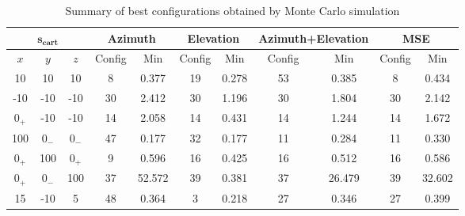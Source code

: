 \begin{table}[!htbp] %
	\begin{center}
		\begin{tabular}{ c c c |c c | c c | c c | c c }
			\toprule
			\multicolumn{3}{c|}{\textbf{$\bm{s_{cart}}$}} & \multicolumn{2}{c|}{\textbf{Azimuth}} & \multicolumn{2}{c|}{\textbf{Elevation}} & \multicolumn{2}{c|}{\textbf{Azimuth+Elevation}} & \multicolumn{2}{c}{\textbf{MSE}}   \\
			\midrule
			\multicolumn{1}{c}{$x$} & $y$ & $z$ & Config & Min  & Config & Min & Config & Min & Config & Min \\
			\midrule
			\multirow{1}{*}{10} & 10 & 10 & 8 & 0.377 & 19 & 0.278 &  53 & 0.385 & 8  & 0.434\\
			\midrule
			\multirow{1}{*}{-10} & -10 & -10 & 30 & 2.412 & 30 & 1.196 &  30 & 1.804 & 30  & 2.142\\
			\midrule
			\multirow{1}{*}{$0_{+}$} & -10 & -10 & 14 & 2.058 & 14 & 0.431 & 14 & 1.244  & 14  & 1.672 \\
			\midrule
			\multirow{1}{*}{100} & $0_{-}$ & $0_{-}$ & 47 & 0.177 & 32 & 0.177  & 11 & 0.284  & 11  & 0.330 \\
			\midrule
			\multirow{1}{*}{$0_{+}$} & 100 & $0_{+}$ & 9 & 0.596 & 16 & 0.425 & 16 & 0.512 & 16 & 0.586 \\
			\midrule
			\multirow{1}{*}{$0_{+}$} & $0_{-}$ & 100 & 37 & 52.572  & 39  & 0.381 & 37 & 26.479  & 39 & 32.602 \\
			\midrule
			\multirow{1}{*}{15} & -10 & 5 & 48 & 0.364 & 3 & 0.218 & 27 & 0.346 & 27 & 0.399 \\
			\bottomrule 
		\end{tabular}
		\caption{Summary of best configurations obtained by Monte Carlo simulation}
		\label{tab:montecarlo-best1}
	\end{center}
\end{table}

